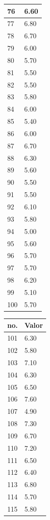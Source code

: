 \begin{table}[!ht]
\begin{tabular}{ |l|l| }
76	&	6.60	\\ \hline
77	&	6.80	\\ \hline
78	&	6.70	\\ \hline
79	&	6.00	\\ \hline
80	&	5.70	\\ \hline
81	&	5.50	\\ \hline
82	&	5.50	\\ \hline
83	&	5.80	\\ \hline
84	&	6.00	\\ \hline
85	&	5.40	\\ \hline
86	&	6.00	\\ \hline
87	&	6.70	\\ \hline
88	&	6.30	\\ \hline
89	&	5.60	\\ \hline
90	&	5.50	\\ \hline
91	&	5.50	\\ \hline
92	&	6.10	\\ \hline
93	&	5.80	\\ \hline
94	&	5.00	\\ \hline
95	&	5.60	\\ \hline
96	&	5.70	\\ \hline
97	&	5.70	\\ \hline
98	&	6.20	\\ \hline
99	&	5.10	\\ \hline
100	&	5.70	\\ \hline
\end{tabular}
\begin{tabular}{ |l|l| }
\hline
 no. & Valor \\ \hline
101	&	6.30	\\ \hline
102	&	5.80	\\ \hline
103	&	7.10	\\ \hline
104	&	6.30	\\ \hline
105	&	6.50	\\ \hline
106	&	7.60	\\ \hline
107	&	4.90	\\ \hline
108	&	7.30	\\ \hline
109	&	6.70	\\ \hline
110	&	7.20	\\ \hline
111	&	6.50	\\ \hline
112	&	6.40	\\ \hline
113	&	6.80	\\ \hline
114	&	5.70	\\ \hline
115	&	5.80	\\ \hline

\end{tabular}
\end{table}
